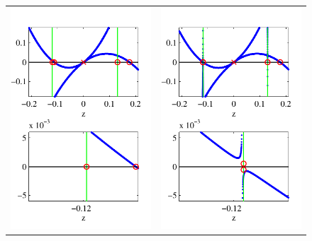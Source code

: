 \documentclass[review,onefignum,onetabnum]{siamart171218}
\begin{document}
\begin{figure}[ht]%
\begin{center}
\begin{tabular}{cc}
\includegraphics{KreinEvalK000Mu36} &
\includegraphics{KreinEvalK005Mu36}

\end{tabular}
\end{center}
\end{figure}
\end{document}
